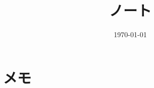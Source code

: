 \documentclass[6pt]{jreport}
\title{ノート}
\author{}
\date{\today}
\begin{document}
\maketitle
\tableofcontents

\chapter{メモ}
%


%
%
%



\end{document}
